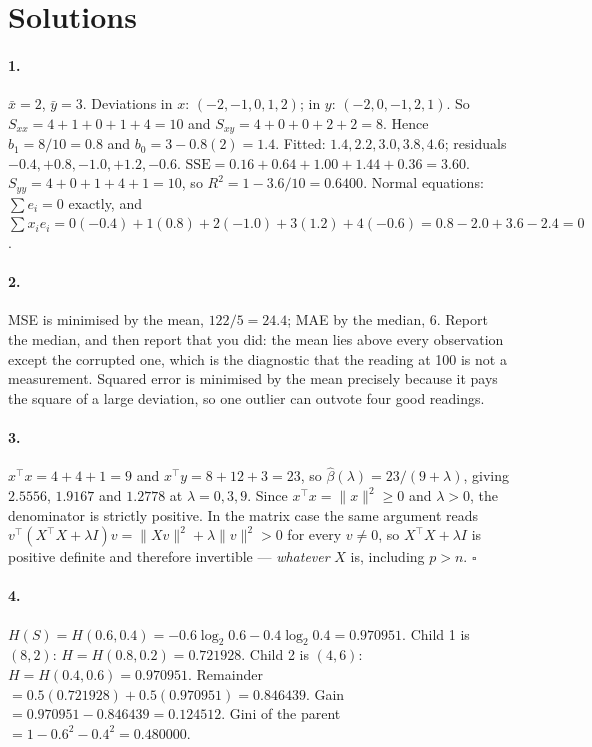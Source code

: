 \documentclass[11pt]{article}
\begin{document}
\section{Solutions}
\label{sec:solutions}

\paragraph{1.} $\bar x = 2$, $\bar y = 3$. Deviations in $x$:
$(-2,-1,0,1,2)$; in $y$: $(-2,0,-1,2,1)$. So $S_{xx} = 4+1+0+1+4 = 10$ and
$S_{xy} = 4+0+0+2+2 = 8$. Hence $b_1 = 8/10 = 0.8$ and
$b_0 = 3 - 0.8(2) = 1.4$. Fitted: $1.4, 2.2, 3.0, 3.8, 4.6$; residuals
$-0.4, +0.8, -1.0, +1.2, -0.6$. $\mathrm{SSE} = 0.16+0.64+1.00+1.44+0.36 =
3.60$. $S_{yy} = 4+0+1+4+1 = 10$, so $R^2 = 1 - 3.6/10 = 0.6400$.
Normal equations: $\sum e_i = 0$ exactly, and
$\sum x_i e_i = 0(-0.4)+1(0.8)+2(-1.0)+3(1.2)+4(-0.6) = 0.8-2.0+3.6-2.4 = 0$.

\paragraph{2.} MSE is minimised by the mean, $122/5 = 24.4$; MAE by the
median, $6$. Report the median, and then report that you did: the mean lies
above every observation except the corrupted one, which is the diagnostic
that the reading at 100 is not a measurement. Squared error is minimised by
the mean precisely because it pays the square of a large deviation, so one
outlier can outvote four good readings.

\paragraph{3.} $x^\top x = 4 + 4 + 1 = 9$ and
$x^\top y = 8 + 12 + 3 = 23$, so $\hat\beta(\lambda) = 23/(9 + \lambda)$,
giving $2.5556$, $1.9167$ and $1.2778$ at $\lambda = 0, 3, 9$. Since
$x^\top x = \lVert x \rVert^2 \geq 0$ and $\lambda > 0$, the denominator is
strictly positive. In the matrix case the same argument reads
$v^\top(X^\top X + \lambda I)v = \lVert Xv \rVert^2 + \lambda\lVert v\rVert^2
> 0$ for every $v \neq 0$, so $X^\top X + \lambda I$ is positive definite and
therefore invertible --- \emph{whatever} $X$ is, including $p > n$.
\ensuremath{\square}

\paragraph{4.} $H(S) = H(0.6, 0.4) = -0.6\log_2 0.6 - 0.4\log_2 0.4 =
0.970951$. Child 1 is $(8,2)$: $H = H(0.8,0.2) = 0.721928$. Child 2 is
$(4,6)$: $H = H(0.4,0.6) = 0.970951$. Remainder $= 0.5(0.721928) +
0.5(0.970951) = 0.846439$. Gain $= 0.970951 - 0.846439 = 0.124512$.
Gini of the parent $= 1 - 0.6^2 - 0.4^2 = 0.480000$.
\end{document}
